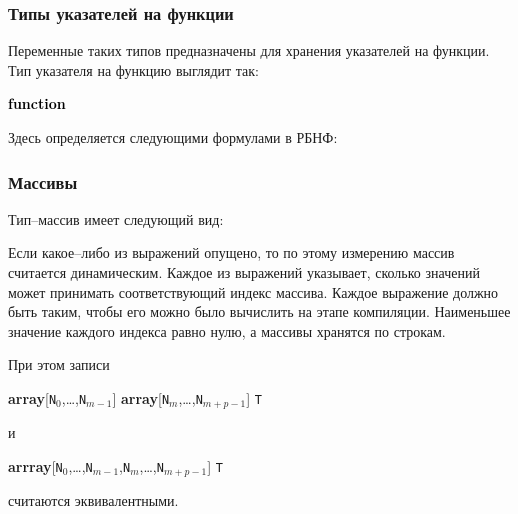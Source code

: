 \documentclass[10pt]{report}
\begin{document}
        \subsubsection{Типы указателей на функции}

Переменные таких типов предназначены для хранения указателей на функции. Тип указателя на функцию выглядит так:
\begin{center}
\noindent\textcolor{Green}{\textcolor{Black}{\textbf{function}}  }
\end{center}

Здесь \textcolor{Green}{} определяется следующими формулами в РБНФ:

\textcolor{Green}{}

        \subsubsection{Массивы}
Тип--массив имеет следующий вид:
\begin{center}
\noindent\textcolor{Green}{}
\end{center}


Если какое--либо из выражений опущено, то по этому измерению массив считается динамическим. Каждое из выражений указывает, сколько значений может принимать соответствующий
индекс массива. Каждое выражение должно быть таким, чтобы его можно было вычислить на этапе компиляции. Наименьшее значение каждого индекса равно нулю, а массивы хранятся по
строкам.

При этом записи
\begin{center}
\textbf{array}[\texttt{N}$_0$,\dots,\texttt{N}$_{m-1}$] \textbf{array}[\texttt{N}$_{m}$,\dots,\texttt{N}$_{m+p-1}$] \texttt{T}
\end{center}
и
\begin{center}
\textbf{arrray}[\texttt{N}$_0$,\dots,\texttt{N}$_{m-1}$,\texttt{N}$_{m}$,\dots,\texttt{N}$_{m+p-1}$] \texttt{T}
\end{center}
считаются эквивалентными.
\end{document}
